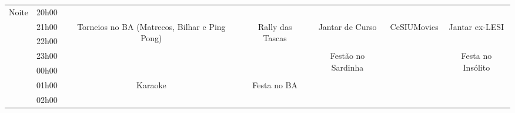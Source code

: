 \begin{center}
\begin{tabular}{|c||c|c|c|c|c|c|}
\multirow{6}{*}{Noite}   & 20h00 &       &        &         &      &        \\  \cline{2-7} 
             & 21h00 &
\multirow{4}{*}{\parbox{2.5cm}{\centering Torneios no BA (Matrecos, Bilhar e Ping Pong)}}   
                       &
\multirow{4}{*}{\parbox{2.5cm}{\centering Rally das Tascas}}
                                  &
Jantar de Curso                                &
\multirow{3}{*}{\parbox{2.5cm}{\centering CeSIUMovies}}              &
Jantar ex-LESI                                           \\ \cline{2-2} \cline{5-5} \cline{7-7}
             & 22h00 &        &        &         &      &        \\ \cline{2-2} \cline{5-5} \cline{7-7}
             & 23h00 &        &        &
\multirow{4}{*}{\parbox{2.5cm}{\centering Festão no Sardinha}}
                                  &        &
\multirow{4}{*}{\parbox{2.5cm}{\centering Festa no Insólito}}                 \\ \cline{2-2} \cline{6-6}
             & 00h00 &       &        &         &      &        \\ \cline{2-3} \cline{4-4} \cline{6-6}
             & 01h00 &
\multirow{2}{*}{\parbox{2.5cm}{\centering Karaoke}}   
                       &
\multirow{2}{*}{\parbox{2.5cm}{\centering Festa no BA}}
                                 &         &        &        \\ \cline{2-2} \cline{6-6}
             & 02h00 &        &        &         &      &        \\ \hline
\end{tabular}
\end{center}


